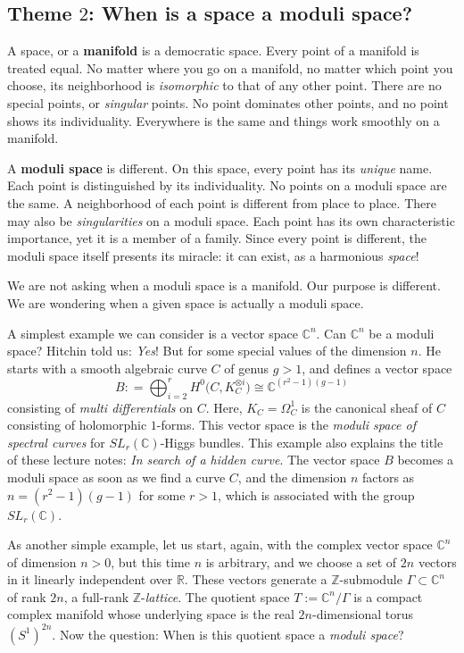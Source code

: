 \documentclass{amsart}
\theoremstyle{definition}
\numberwithin{equation}{section}
\numberwithin{figure}{section}
\def\isom{\cong}
\def\tensor{\otimes}
\def\Gam{\Gamma}
\newcommand{\be}{\begin{equation}}
\newcommand{\ee}{\end{equation}}
\newcommand{\bC}{{\mathbb{C}}}
\newcommand{\bR}{{\mathbb{R}}}
\newcommand{\bZ}{{\mathbb{Z}}}
\begin{document}
\subsection{Theme $2$: When is a space a moduli space?}
\label{theme2}
A space, or a \textbf{manifold} is a democratic space. 
Every point of a manifold is 
treated equal. No matter where you go on a manifold,  no matter 
which point you choose, its neighborhood is \emph{isomorphic}
to that of any other point. There are no special points, or \emph{singular} 
points. No point dominates other points, and no point shows its individuality. 
Everywhere is the same and things work smoothly on a manifold.


A \textbf{moduli space} is different. On this space, every point has 
its \emph{unique} name. Each point is distinguished by its individuality. 
No points on a moduli space are the same. A neighborhood of each point is
different from place to place. There may  also be \emph{singularities}
on a moduli space. Each point has its own characteristic importance, yet it 
is a member of a  family.
Since every point is different, the moduli space itself
presents its miracle: it can exist, as a harmonious \emph{space}! 

We are not asking when a moduli space is a manifold. Our purpose is 
different. We are wondering when a given space 
is actually a moduli space. 

A simplest example we can consider is a vector space $\bC^n$. 
Can $\bC^n$ be a moduli space? Hitchin \cite{H1} told us: \emph{Yes}!
But for some special values of the dimension $n$. He starts with a smooth 
algebraic curve $C$ of genus $g>1$, and defines a vector space
\be
\label{HitchinBase}
B: = \bigoplus_{i=2}^r H^0\big(C,K_C^{\tensor i}\big)
\isom \bC^{(r^2-1)(g-1)}
\ee
consisting of \emph{multi differentials} on $C$. Here, $K_C=\Omega_C^1$ is
the canonical sheaf of $C$ consisting of holomorphic $1$-forms. This vector space is the 
\emph{moduli space of spectral curves} for $SL_r(\bC)$-Higgs bundles.
This example also explains the title of these lecture notes: 
\emph{In search of a hidden curve}. The vector space $B$ becomes a
moduli space as soon as we find a curve $C$, and the dimension $n$ 
factors as $n=(r^2-1)(g-1)$ for some $r>1$, which is associated with 
the group $SL_r(\bC)$.


As another simple example, let us start, again,  with the complex vector space 
$\bC^n$ of dimension $n>0$, but this time $n$ is arbitrary,
and we choose a set of 
$2n$ vectors in it linearly independent over $\bR$.  
These vectors generate a $\bZ$-submodule $\Gam\subset \bC^n$
of rank $2n$, a full-rank $\bZ$-\emph{lattice}. The quotient space
$T:=\bC^n/\Gam$ is a compact complex manifold whose underlying
space is the real $2n$-dimensional torus $(S^1)^{2n}$.
Now the question: When is this quotient space a \emph{moduli space}?
\end{document}
